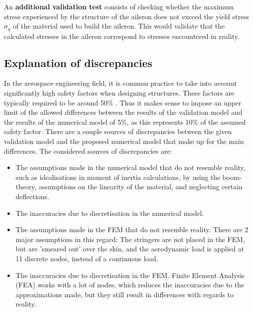 \noindent An \textbf{additional validation test} consists of checking whether the maximum stress experienced by the structure of the aileron does not exceed the yield stress $\sigma_y$ of the material used to build the aileron. This would validate that the calculated stresses in the aileron correspond to stresses encountered in reality.   

\subsection{Explanation of discrepancies}
In the aerospace engineering field, it is common practice to take into account significantly high safety factors when designing structures. These factors are typically required to be around 50\% \cite{safety_factors}. Thus it makes sense to impose an upper limit of the allowed differences between the results of the validation model and the results of the numerical model of 5\%, as this represents 10\% of the assumed safety factor. There are a couple sources of discrepancies between the given validation model and the proposed numerical model that make up for the main differences. The considered sources of discrepancies are:

\begin{itemize}
    \item The assumptions made in the numerical model that do not resemble reality, such as idealisations in moment of inertia calculations, by using the boom-theory, assumptions on the linearity of the material, and neglecting certain deflections.
    \item The inaccuracies due to discretisation in the numerical model.
    \item The assumptions made in the FEM that do not resemble reality. There are 2 major assumptions in this regard: The stringers are not placed in the FEM, but are 'smeared out' over the skin, and the aerodynamic load is applied at 11 discrete nodes, instead of a continuous load.
    \item The inaccuracies due to discretisation in the FEM. Finite Element Analysis (FEA) works with a lot of nodes, which reduces the inaccuracies due to the approximations made, but they still result in differences with regards to reality.
\end{itemize}



